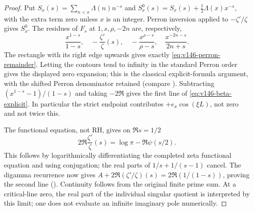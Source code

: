 \documentclass[11pt]{article}
\theoremstyle{remark}
\begin{document}
\begin{proof}
Put $S_x(s)=\sum_{n<x}\Lambda(n)n^{-s}$ and
$S_x^0(s)=S_x(s)+\tfrac12\Lambda(x)x^{-s}$, with the extra term zero
unless $x$ is an integer. Perron inversion applied to $-\zeta'/\zeta$
gives $S_x^0$. The residues of $F_s$ at $1,s,\rho,-2n$ are,
respectively,
\[
 \frac{x^{1-s}}{1-s},\quad-\frac{\zeta'}\zeta(s),\quad
 -\frac{x^{\rho-s}}{\rho-s},\quad\frac{x^{-2n-s}}{2n+s}.
\]
The rectangle with its right edge upwards gives exactly
\eqref{eq:v146-perron-remainder}. Letting the contours tend to infinity
in the standard Perron order gives the displayed zero expansion;
this is the classical explicit-formula argument, with the shifted
Perron denominator retained (compare \cite{HarperZetaNotes}).
Subtracting $(x^{1-s}-1)/(1-s)$ and taking $-2\Re$ gives the first
line of \eqref{eq:v146-beta-explicit}. In particular the strict
endpoint contributes $+e_x\cos(\xi L)$, not zero and not twice this.

The functional equation, not RH, gives on $\Re s=1/2$
\[
 2\Re\frac{\zeta'}\zeta(s)=\log\pi-\Re\psi(s/2).
\]
This follows by logarithmically differentiating the completed zeta
functional equation and using conjugation; the real parts of
$1/s+1/(s-1)$ cancel. The digamma recurrence now gives
$A+2\Re(\zeta'/\zeta)(s)=2\Re(1/(1-s))$, proving the second line
(\cite{DLMFZetaReflection}). Continuity follows from the original
finite prime sum. At a critical-line zero, the real part of the
individual singular quotient is interpreted by this limit; one does
not evaluate an infinite imaginary pole numerically.
\end{proof}
\end{document}
